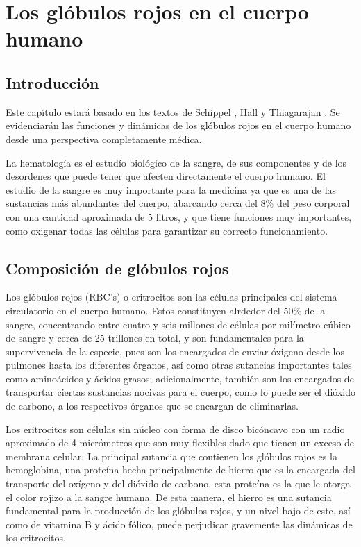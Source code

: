 \chapter{Los glóbulos rojos en el cuerpo humano}\label{chap:RBC}
\section{Introducción}\label{sec:RBC:intro}
Este capítulo estará basado en los textos de Schippel \cite{schippel2023dynamics}, Hall \cite{hall2021guyton} y Thiagarajan \cite{thiagarajan2021red}. Se evidenciarán las funciones y dinámicas de los glóbulos rojos en el cuerpo humano desde una perspectiva completamente médica.

La hematología es el estudío biológico de la sangre, de sus componentes y de los desordenes que puede tener que afecten directamente el cuerpo humano. El estudio de la sangre es muy importante para la medicina ya que es una de las sustancias más abundantes del cuerpo, abarcando cerca del 8\% del peso corporal con una cantidad aproximada de 5 litros, y que tiene funciones muy importantes, como oxigenar todas las células para garantizar su correcto funcionamiento.

\section{Composición de glóbulos rojos}\label{sec:RBC:Composicion}
Los glóbulos rojos (RBC's) o eritrocitos son las células principales del sistema circulatorio en el cuerpo humano. Estos constituyen alrdedor del 50\% de la sangre, concentrando entre cuatro y seis millones de células por milímetro cúbico de sangre y cerca de 25 trillones en total, y son fundamentales para la supervivencia de la especie, pues son los encargados de enviar óxigeno desde los pulmones hasta los diferentes órganos, así como otras sutancias importantes tales como aminoácidos y ácidos grasos; adicionalmente, también son los encargados de transportar ciertas sustancias nocivas para el cuerpo, como lo puede ser el dióxido de carbono, a los respectivos órganos que se encargan de eliminarlas.

Los eritrocitos son células sin núcleo con forma de disco bicóncavo con un radio aproximado de 4 micrómetros que son muy flexibles dado que tienen un exceso de membrana celular. La principal sutancia que contienen los glóbulos rojos es la hemoglobina, una proteína hecha principalmente de hierro que es la encargada del transporte del oxígeno y del dióxido de carbono, esta proteína es la que le otorga el color rojizo a la sangre humana. De esta manera, el hierro es una sutancia fundamental para la producción de los glóbulos rojos, y un nivel bajo de este, así como de vitamina B y ácido fólico, puede perjudicar gravemente las dinámicas de los eritrocitos.

